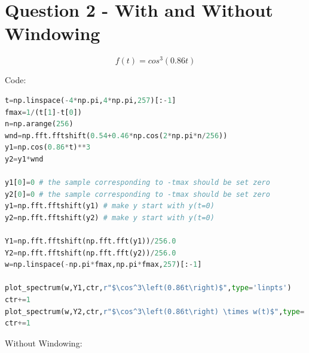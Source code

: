 \documentclass[12pt]{article}
\begin{document}
\section{Question 2 - With and Without Windowing}

$$f(t) = cos^3\left(0.86 t\right)$$

Code:
\begin{lstlisting}[language=Python]
t=np.linspace(-4*np.pi,4*np.pi,257)[:-1]
fmax=1/(t[1]-t[0])
n=np.arange(256)
wnd=np.fft.fftshift(0.54+0.46*np.cos(2*np.pi*n/256))
y1=np.cos(0.86*t)**3
y2=y1*wnd

y1[0]=0 # the sample corresponding to -tmax should be set zero
y2[0]=0 # the sample corresponding to -tmax should be set zero
y1=np.fft.fftshift(y1) # make y start with y(t=0)
y2=np.fft.fftshift(y2) # make y start with y(t=0)

Y1=np.fft.fftshift(np.fft.fft(y1))/256.0
Y2=np.fft.fftshift(np.fft.fft(y2))/256.0
w=np.linspace(-np.pi*fmax,np.pi*fmax,257)[:-1]

plot_spectrum(w,Y1,ctr,r"$\cos^3\left(0.86t\right)$",type='linpts')
ctr+=1
plot_spectrum(w,Y2,ctr,r"$\cos^3\left(0.86t\right) \times w(t)$",type='linpts')
ctr+=1
\end{lstlisting}
\pagebreak
Without Windowing:
\end{document}
